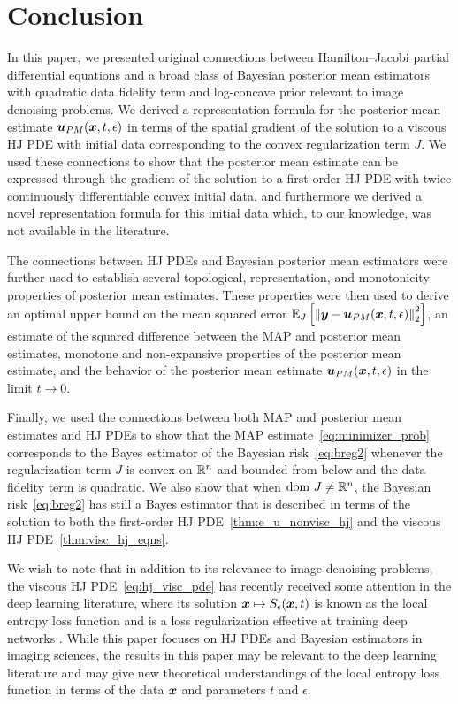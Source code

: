 \section{Conclusion} \label{sec:conclusion}

In this paper, we presented original connections between Hamilton--Jacobi partial differential equations and a broad class of Bayesian posterior mean estimators with quadratic data fidelity term and log-concave prior relevant to image denoising problems. We derived a representation formula for the posterior mean estimate $\boldsymbol{u}_{PM}(\boldsymbol{x},t,\epsilon)$ in terms of the spatial gradient of the solution to a viscous HJ PDE with initial data corresponding to the convex regularization term $J$. We used these connections to show that the posterior mean estimate can be expressed through the gradient of the solution to a first-order HJ PDE with twice continuously differentiable convex initial data, and furthermore we derived a novel representation formula for this initial data which, to our knowledge, was not available in the literature.

The connections between HJ PDEs and Bayesian posterior mean estimators were further used to establish several topological, representation, and monotonicity properties of posterior mean estimates. These properties were then used to derive an optimal upper bound on the mean squared error $\mathbb{E}_{J}\left [{\left\Vert{\boldsymbol{y}-\boldsymbol{u}_{PM}(\boldsymbol{x},t,\epsilon)} \right\Vert_{2}^{2}}\right]$, an estimate of the squared difference between the MAP and posterior mean estimates, monotone and non-expansive properties of the posterior mean estimate, and the behavior of the posterior mean estimate $\boldsymbol{u}_{PM}(\boldsymbol{x},t,\epsilon)$ in the limit $t \to 0$. 

Finally, we used the connections between both MAP and posterior mean estimates and HJ PDEs to show that the MAP estimate~\eqref{eq:minimizer_prob} corresponds to the Bayes estimator of the Bayesian risk~\eqref{eq:breg2} whenever the regularization term $J$ is convex on $\mathbb{R}^n$ and bounded from below and the data fidelity term is quadratic. We also show that when $\mathrm{dom~} J \neq \mathbb{R}^n$, the Bayesian risk~\eqref{eq:breg2} has still a Bayes estimator that is described in terms of the solution to both the first-order HJ PDE~\eqref{thm:e_u_nonvisc_hj} and the viscous HJ PDE~\eqref{thm:visc_hj_eqns}.

We wish to note that in addition to its relevance to image denoising problems, the viscous HJ PDE~\eqref{eq:hj_visc_pde} has recently received some attention in the deep learning literature, where its solution $\boldsymbol{x} \mapsto S_\epsilon(\boldsymbol{x},t)$ is known as the local entropy loss function and is a loss regularization effective at training deep networks \cite{chaudhari2018deep,chaudhari2019entropy,garcia2019variational,vidal2017mathematics}. While this paper focuses on HJ PDEs and Bayesian estimators in imaging sciences, the results in this paper may be relevant to the deep learning literature and may give new theoretical understandings of the local entropy loss function in terms of the data $\boldsymbol{x}$ and parameters $t$ and $\epsilon$.

